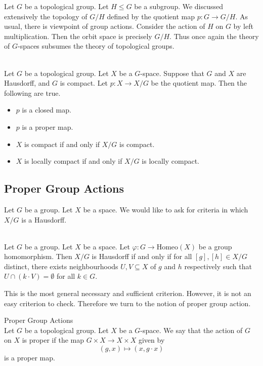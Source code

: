 \documentclass[a4paper]{article}
\begin{document}
Let $G$ be a topological group. Let $H\leq G$ be a subgroup. We discussed extensively the topology of $G/H$ defined by the quotient map $p:G\to G/H$. As usual, there is viewpoint of group actions. Consider the action of $H$ on $G$ by left multiplication. Then the orbit space is precisely $G/H$. Thus once again the theory of $G$-spaces subsumes the theory of topological groups. 

\begin{prp}{}{}\\
Let $G$ be a topological group. Let $X$ be a $G$-space. Suppose that $G$ and $X$ are Hausdorff, and $G$ is compact. Let $p:X\to X/G$ be the quotient map. Then the following are true. 
\begin{itemize}
\item $p$ is a closed map. 
\item $p$ is a proper map. 
\item $X$ is compact if and only if $X/G$ is compact. 
\item $X$ is locally compact if and only if $X/G$ is locally compact. 
\end{itemize}
\end{prp}

\subsection{Proper Group Actions}
Let $G$ be a group. Let $X$ be a space. We would like to ask for criteria in which $X/G$ is a Hausdorff. 

\begin{prp}{}{}\\
Let $G$ be a group. Let $X$ be a space. Let $\varphi:G\to\text{Homeo}(X)$ be a group homomorphism. Then $X/G$ is Hausdorff if and only if for all $[g],[h]\in X/G$ distinct, there exists neighbourhoods $U,V\subseteq X$ of $g$ and $h$ respectively such that $U\cap(k\cdot V)=\emptyset$ for all $k\in G$. 
\end{prp}

This is the most general necessary and sufficient criterion. However, it is not an easy criterion to check. Therefore we turn to the notion of proper group action. 

\begin{defn}{Proper Group Actions}{}\\
Let $G$ be a topological group. Let $X$ be a $G$-space. We say that the action of $G$ on $X$ is proper if the map $G\times X\to X\times X$ given by $$(g,x)\mapsto(x,g\cdot x)$$ is a proper map. 
\end{defn}
\end{document}
